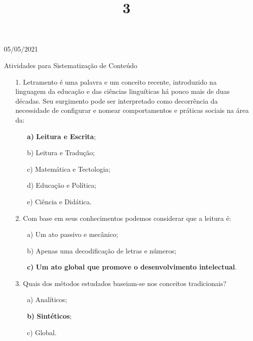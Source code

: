 \documentclass{SchoolBook}
\begin{document}
    \begin{day}{05/05/2021}
        \title{3}{Atividades para Sistematização de Conteúdo}
        
        \begin{enumerate}
            \item[1.] Letramento é uma palavra e um conceito recente, introduzido na linguagem da educação e das ciências linguíticas há pouco mais de duas décadas. Seu surgimento pode ser interpretado como decorrência da necessidade de configurar e nomear comportamentos e práticas sociais na área da:
            \begin{enumerate}[nosep]
                \item[\bf a)] \textbf{Leitura e Escrita};
                \item[b)] Leitura e Tradução;
                \item[c)] Matemática e Tectologia;
                \item[d)] Educação e Política;
                \item[e)] Ciência e Didática.
            \end{enumerate}
            
            \item[2.] Com base em seus conhecimentos podemos considerar que a leitura é:
            \begin{enumerate}[nosep]
                \item[a)] Um ato passivo e mecânico;
                \item[b)] Apenas uma decodificação de letras e números;
                \item[\bf c)] \textbf{Um ato global que promove o desenvolvimento intelectual}.
            \end{enumerate}
            
            \item[3.] Quais dos métodos estudados baseiam-se nos conceitos tradicionais?
            \begin{enumerate}[nosep]
                \item[a)] Analíticos;
                \item[\bf b)] \textbf{Sintéticos};
                \item[c)] Global.
            \end{enumerate}
        \end{enumerate}
    \end{day}
\end{document}
